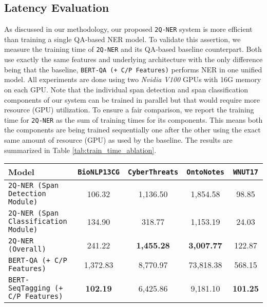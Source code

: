 \subsection{Latency Evaluation}
As discussed in our methodology, our proposed \texttt{2Q-NER} system is more efficient than training a single QA-based NER model. To validate this assertion, we measure the training time of \texttt{2Q-NER} and its QA-based baseline counterpart. Both use exactly the same features and underlying architecture with the only difference being that the baseline, \texttt{BERT-QA (+ C/P Features)} performs NER in one unified model. All experiments are done using two \textit{Nvidia V100} GPUs with 16G memory on each GPU. Note that the individual span detection and span classification components of our system can be trained in parallel but that would require more resource (GPU) utilization. To ensure a fair comparison, we report the training time for \texttt{2Q-NER} as the sum of training times for its components. This means both the components are being trained sequentially one after the other using the exact same amount of resource (GPU) as used by the baseline. The results are summarized in Table \ref{tab:train_time_ablation}.


\begin{table*}[h!]
\centering
\begin{small}
\begin{tabular}{lcccc}\toprule
 Model & \texttt{BioNLP13CG} & \texttt{CyberThreats} & \texttt{OntoNotes} & \texttt{WNUT17} \\ \toprule 
\texttt{2Q-NER (Span Detection Module)} & 106.32 & 1,136.50 &  1,854.58  & 98.85 \\
\texttt{2Q-NER (Span Classification Module)} & 134.90 & 318.77 & 1,153.19 & 24.03 \\ \toprule
\texttt{2Q-NER (Overall)}     & 241.22 & \textbf{1,455.28} & \textbf{3,007.77} & 122.87 \\
\texttt{BERT-QA (+ C/P Features)} & 1,372.83 & 8,770.97 &  73,818.38   & 568.15\\
\texttt{BERT-SeqTagging (+ C/P Features)} & \textbf{102.19} & 6,425.86 &  9,181.10   & \textbf{101.25}\\
\bottomrule
\end{tabular}
\caption{Latency Comparison (training time in seconds per epoch). Overall pipelined \texttt{2Q-NER} training time is calculated as the sum of training times for individual \textit{Span Detection Module} and \textit{Span Classification Module}. Best (minimum latency) result is highlighted in bold.
}
\label{tab:train_time_ablation}
\end{small}
\end{table*}

